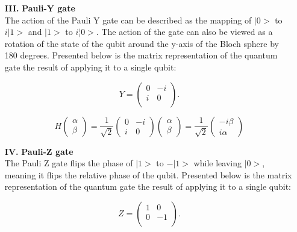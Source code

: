 \documentclass[onecolumn,10pt,cleanfoot]{asme2ej}
\begin{document}
\begin{enumerate}
	\item[\textbf{III.}] \textbf{Pauli-Y gate} \\
		The action of the Pauli Y gate can be described as the mapping of $|0>$ to $i|1>$ and $|1>$ to $i¦0>$. The action of the gate can also be viewed as a rotation of the state of the qubit around the y-axis of the Bloch sphere by 180 degrees. Presented below is the matrix representation of the quantum gate the result of applying it to a single qubit:

		\begin{equation*}
			Y = \begin{pmatrix}
			0 & -i \\
			i & 0 \\
		\end{pmatrix}.
	\end{equation*}

	\begin{equation*}
		H \begin{pmatrix}
		\alpha \\
		\beta
		\end{pmatrix}
		=
		\frac{1}{\sqrt{2}}\begin{pmatrix}
		0 & -i \\
		i & 0
		\end{pmatrix}
		\begin{pmatrix}
		\alpha \\
		\beta
		\end{pmatrix}
		=
		\frac{1}{\sqrt{2}}\begin{pmatrix}
		-i\beta \\
		i\alpha
		\end{pmatrix}
	\end{equation*}


	\item[\textbf{IV.}] \textbf{Pauli-Z gate} \\
		The Pauli Z gate flips the phase of $|1>$ to $-|1>$ while leaving $|0>$, meaning it flips the relative phase of the qubit. Presented below is the matrix representation of the quantum gate the result of applying it to a single qubit:

		\begin{equation*}
			Z = \begin{pmatrix}
			1 & 0 \\
			0 & -1 \\
		\end{pmatrix}.
	\end{equation*} 


\end{enumerate}
\end{document}
